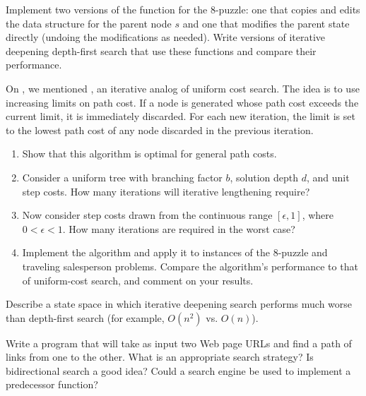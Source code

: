 \begin{iexercise}%
\prgex
Implement two versions of the   function for the 8-puzzle:
one that copies and edits the data structure for the parent node \(s\) and one that
modifies the parent state
directly (undoing the modifications as needed). Write versions of
iterative deepening depth-first search that use these functions and compare
their performance.
\end{iexercise} 

\begin{exercise}%
\prgex
On , we mentioned , an iterative analog of uniform cost search. The  idea is
to use increasing limits on path cost. If a node is generated whose
path cost exceeds the current limit, it is immediately discarded.
For each new iteration, the limit is set to the lowest path cost
of any node discarded in the previous iteration.
\begin{enumerate}
\item Show that this algorithm is optimal for general path costs.
\item Consider a uniform tree with branching factor \(b\),
solution depth \(d\), and unit step costs. How many iterations
will iterative lengthening require?
\item Now consider step costs drawn from the continuous range \([\epsilon,1]\),
where \(0 < \epsilon < 1\). How many iterations are required in
the worst case?
\item Implement the algorithm and apply it to instances of
the 8-puzzle and traveling salesperson problems. Compare the
algorithm's performance to that of uniform-cost search, and comment
on your results.
\end{enumerate}
\end{exercise} 

\begin{exercise}
Describe a state space in which iterative deepening search performs
much worse than depth-first search (for example, \(O(n^{2})\) vs. \(O(n)\)).
\end{exercise} 

\begin{exercise}%
\prgex Write a program that will take as input two Web page URLs and
find a path of links from one to the other.  What is an appropriate
search strategy?  Is bidirectional search a good idea?  Could a search
engine be used to implement a predecessor function?
\end{exercise} 

